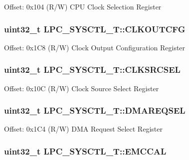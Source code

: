 Offset\-: 0x104 (R/\-W) C\-P\-U Clock Selection Register \hypertarget{structLPC__SYSCTL__T_aebd09c67da35ee48eb53ef129aa2b76e}{
\subsubsection[{C\-L\-K\-O\-U\-T\-C\-F\-G}]{ uint32\-\_\-t L\-P\-C\-\_\-\-S\-Y\-S\-C\-T\-L\-\_\-\-T\-::\-C\-L\-K\-O\-U\-T\-C\-F\-G}}\label{structLPC__SYSCTL__T_aebd09c67da35ee48eb53ef129aa2b76e}
Offset\-: 0x1\-C8 (R/\-W) Clock Output Configuration Register \hypertarget{structLPC__SYSCTL__T_a0ddcaa3fe7ae45dfee7e17f6ec93138e}{
\subsubsection[{C\-L\-K\-S\-R\-C\-S\-E\-L}]{ uint32\-\_\-t L\-P\-C\-\_\-\-S\-Y\-S\-C\-T\-L\-\_\-\-T\-::\-C\-L\-K\-S\-R\-C\-S\-E\-L}}\label{structLPC__SYSCTL__T_a0ddcaa3fe7ae45dfee7e17f6ec93138e}
Offset\-: 0x10\-C (R/\-W) Clock Source Select Register \hypertarget{structLPC__SYSCTL__T_a1915d9b403571a380a581c82352b8e4a}{
\subsubsection[{D\-M\-A\-R\-E\-Q\-S\-E\-L}]{ uint32\-\_\-t L\-P\-C\-\_\-\-S\-Y\-S\-C\-T\-L\-\_\-\-T\-::\-D\-M\-A\-R\-E\-Q\-S\-E\-L}}\label{structLPC__SYSCTL__T_a1915d9b403571a380a581c82352b8e4a}
Offset\-: 0x1\-C4 (R/\-W) D\-M\-A Request Select Register \hypertarget{structLPC__SYSCTL__T_aa7c40eaca1081f3133eda04395be6fa6}{
\subsubsection[{E\-M\-C\-C\-A\-L}]{ uint32\-\_\-t L\-P\-C\-\_\-\-S\-Y\-S\-C\-T\-L\-\_\-\-T\-::\-E\-M\-C\-C\-A\-L}}\label{structLPC__SYSCTL__T_aa7c40eaca1081f3133eda04395be6fa6}
